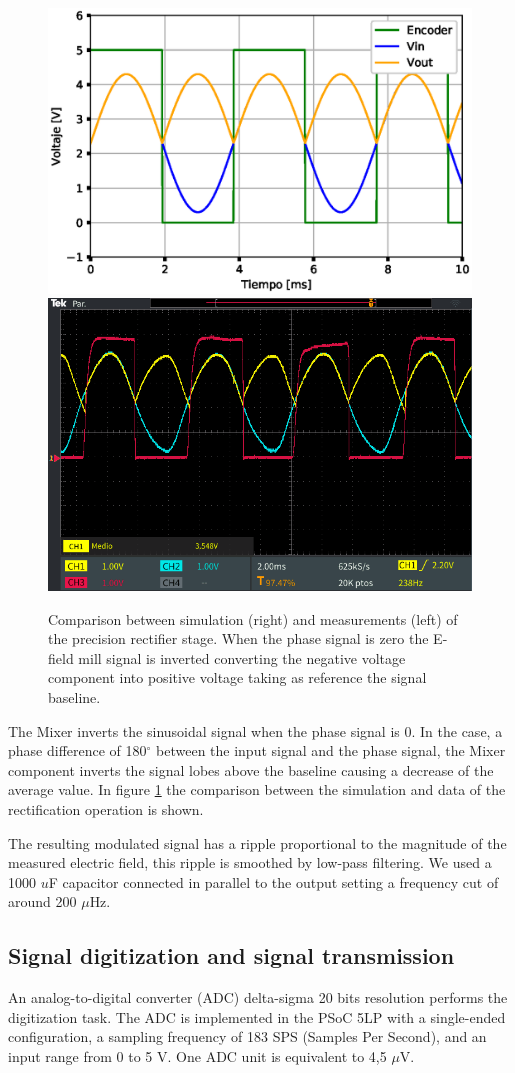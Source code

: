 \documentclass[a4paper]{jpconf}
\begin{document}
\begin{figure}[h]
\begin{center}
\includegraphics[width=.48\textwidth]{Figures/rect_pos.eps}
\includegraphics[width=.48\textwidth]{Figures/ope_psoc.PNG}
\caption{\label{psgraf} Comparison between simulation (right) and measurements (left) of the precision rectifier stage. When the phase signal is zero the E-field mill signal is inverted converting the negative voltage component into positive voltage taking as reference the signal baseline.}
\end{center}
\end{figure}

The Mixer inverts the sinusoidal signal when the phase signal is 0. In the case, a phase difference of 180$^{\circ}$ between the input signal and the phase signal, the Mixer component inverts the signal lobes above the baseline causing a decrease of the average value. In figure \ref{psgraf} the comparison between the simulation and data of the rectification operation is shown.

The resulting modulated signal has a ripple proportional to the magnitude of the measured electric field, this ripple is smoothed by low-pass filtering. We used a 1000 $u$F capacitor connected in parallel to the output setting a frequency cut of around 200 $\mu$Hz.

\subsection{Signal digitization and signal transmission}

An analog-to-digital converter (ADC) delta-sigma 20 bits resolution performs the digitization task. The ADC is implemented in the PSoC 5LP with a single-ended configuration, a sampling frequency of 183 SPS (Samples Per Second), and an input range from 0 to 5 V. One ADC unit is equivalent to 4,5 $\mu$V.
\end{document}
